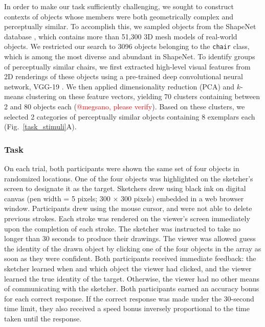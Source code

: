 \documentclass[10pt,letterpaper]{article}
\newcommand{\red}[1]{\textcolor{Red}{#1}}
\begin{document}
In order to make our task sufficiently challenging, we sought to construct contexts of objects whose members were both geometrically complex and perceptually similar. 
To accomplish this, we sampled objects from the ShapeNet database \cite{chang2015shapenet}, which contains more than 51,300 3D mesh models of real-world objects. %
We restricted our search to 3096 objects belonging to the \texttt{chair} class, which is among the most diverse and abundant in ShapeNet. 
To identify groups of perceptually similar chairs, we first extracted high-level visual features from 2D renderings of these objects using a pre-trained deep convolutional neural network, VGG-19 \cite{simonyan2014very}.   
We then applied dimensionality reduction (PCA) and $k$-means clustering on these feature vectors, yielding 70 clusters containing between 2 and 80 objects each (\red{@megsano, please verify}).
Based on these clusters, we selected 2 categories of perceptually similar objects containing 8 exemplars each (Fig.~\ref{task_stimuli}A). 

\subsubsection{Task} 

On each trial, both participants were shown the same set of four objects in randomized locations.
One of the four objects was highlighted on the sketcher's screen to designate it as the target.
Sketchers drew using black ink on digital canvas (pen width = 5 pixels; 300 $\times$ 300 pixels) embedded in a web browser window. 
Participants drew using the mouse cursor, and were not able to delete previous strokes. 
Each stroke was rendered on the viewer's screen immediately upon the completion of each stroke.
The sketcher was instructed to take no longer than 30 seconds to produce their drawings. 
The viewer was allowed guess the identity of the drawn object by clicking one of the four objects in the array as soon as they were confident. 
Both participants received immediate feedback: the sketcher learned when and which object the viewer had clicked, and the viewer learned the true identity of the target. 
Otherwise, the viewer had no other means of communicating with the sketcher. 
Both participants earned an accuracy bonus for each correct response. 
If the correct response was made under the 30-second time limit, they also received a speed bonus inversely proportional to the time taken until the response.
\end{document}
